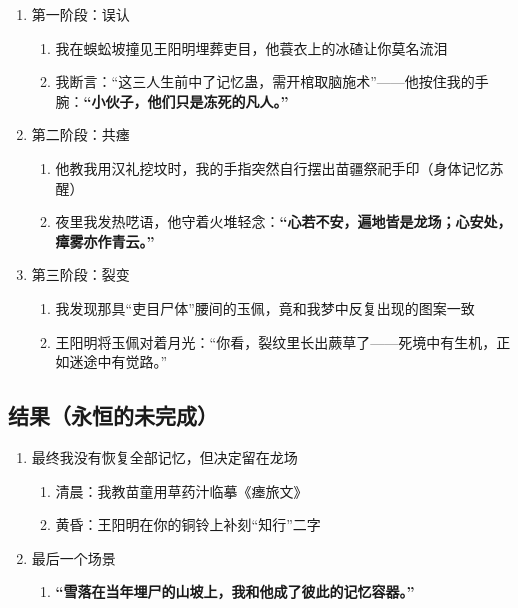 \documentclass{article}
\begin{document}
	\begin{enumerate}[noitemsep, label={· }]
		\item 第一阶段：误认
		
		\begin{enumerate}[noitemsep, label={· }]
			\item 我在蜈蚣坡撞见王阳明埋葬吏目，他蓑衣上的冰碴让你莫名流泪
			\item 我断言：“这三人生前中了记忆蛊，需开棺取脑施术”——他按住我的手腕：\textbf{“小伙子，他们只是冻死的凡人。”}
		\end{enumerate}\textbf{}
		
		\item 第二阶段：共瘗
		
		\begin{enumerate}[noitemsep, label={· }]
			\item 他教我用汉礼挖坟时，我的手指突然自行摆出苗疆祭祀手印（身体记忆苏醒）
			\item 夜里我发热呓语，他守着火堆轻念：\textbf{“心若不安，遍地皆是龙场；心安处，瘴雾亦作青云。”}
		\end{enumerate}\textbf{}
		
		\item 第三阶段：裂变
		
		\begin{enumerate}[noitemsep, label={· }]
			\item 我发现那具“吏目尸体”腰间的玉佩，竟和我梦中反复出现的图案一致
			\item 王阳明将玉佩对着月光：“你看，裂纹里长出蕨草了——死境中有生机，正如迷途中有觉路。”
		\end{enumerate}\textbf{}
		
	\end{enumerate}\textbf{}
	
	\subsection{结果（永恒的未完成）}
	
	\begin{enumerate}[noitemsep, label={· }]
		\item 最终我没有恢复全部记忆，但决定留在龙场
		
		\begin{enumerate}[noitemsep, label={· }]
			\item 清晨：我教苗童用草药汁临摹《瘗旅文》
			\item 黄昏：王阳明在你的铜铃上补刻“知行”二字
		\end{enumerate}\textbf{}
		
		\item 最后一个场景
		
		\begin{enumerate}[noitemsep, label={· }]
			\item \textbf{“雪落在当年埋尸的山坡上，我和他成了彼此的记忆容器。”}
		\end{enumerate}\textbf{}
		
	\end{enumerate}\textbf{}
	
\end{document}
